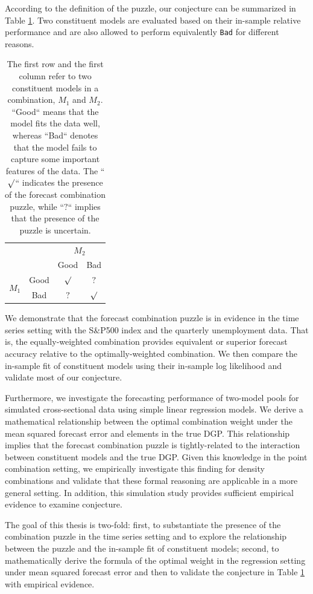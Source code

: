 \documentclass{monashthesis}
\begin{document}
According to the definition of the puzzle, our conjecture can be summarized in Table \ref{tab:1}. Two constituent models are evaluated based on their in-sample relative performance and are also allowed to perform equivalently \texttt{Bad} for different reasons.

\begin{table}[ht]
\centering
\begin{tabular}{cccc}
                       &      & \multicolumn{2}{c}{$M_2$} \\
                       &      & Good       & Bad       \\
\multirow{2}{*}{$M_1$} & Good & $\surd$    & $?$ \\
                       & Bad  & $?$        & $\surd$
\end{tabular}
\caption{The first row and the first column refer to two constituent models in a combination, $M_1$ and $M_2$. ``Good`` means that the model fits the data well, whereas ``Bad`` denotes that the model fails to capture some important features of the data. The ``$\surd$`` indicates the presence of the forecast combination puzzle, while ``$?$`` implies that the presence of the puzzle is uncertain.}
\label{tab:1}
\end{table}

We demonstrate that the forecast combination puzzle is in evidence in the time series setting with the S\&P500 index and the quarterly unemployment data. That is, the equally-weighted combination provides equivalent or superior forecast accuracy relative to the optimally-weighted combination. We then compare the in-sample fit of constituent models using their in-sample log likelihood and validate most of our conjecture.

Furthermore, we investigate the forecasting performance of two-model pools for simulated cross-sectional data using simple linear regression models. We derive a mathematical relationship between the optimal combination weight under the mean squared forecast error and elements in the true DGP. This relationship implies that the forecast combination puzzle is tightly-related to the interaction between constituent models and the true DGP. Given this knowledge in the point combination setting, we empirically investigate this finding for density combinations and validate that these formal reasoning are applicable in a more general setting. In addition, this simulation study provides sufficient empirical evidence to examine conjecture.

The goal of this thesis is two-fold: first, to substantiate the presence of the combination puzzle in the time series setting and to explore the relationship between the puzzle and the in-sample fit of constituent models; second, to mathematically derive the formula of the optimal weight in the regression setting under mean squared forecast error and then to validate the conjecture in Table \ref{tab:1} with empirical evidence.
\end{document}
